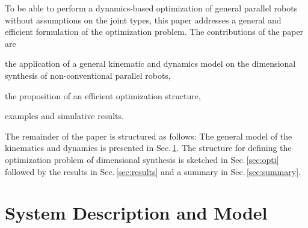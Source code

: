 \documentclass[fleqn,a4paper,10pt]{article}
\newcommand{\bm}[1]{\mathbf{#1}}
\renewcommand{\Phi}[1]{\varPhi{#1}}
\begin{document}
\begin{multicols}{2}
To be able to perform a dynamics-based optimization of general parallel robots without assumptions on the joint types, this paper addresses a general and efficient formulation of the optimization problem.
%
The contributions of the paper are
\begin{compactitem}
\item the application of a general kinematic and dynamics model on the dimensional synthesis of non-conventional parallel robots,
\item the proposition of an efficient optimization structure,
\item examples and simulative results.
\end{compactitem}

The remainder of the paper is structured as follows: The general model of the kinematics and dynamics is presented in Sec.\,\ref{sec:sysmdl}.
The structure for defining the optimization problem of dimensional synthesis is sketched in Sec.\,\ref{sec:opti} followed by the results in Sec.\,\ref{sec:results} and a summary in Sec.\,\ref{sec:summary}.

\section{System Description and Model}
\label{sec:sysmdl}







\end{multicols}
\end{document}
